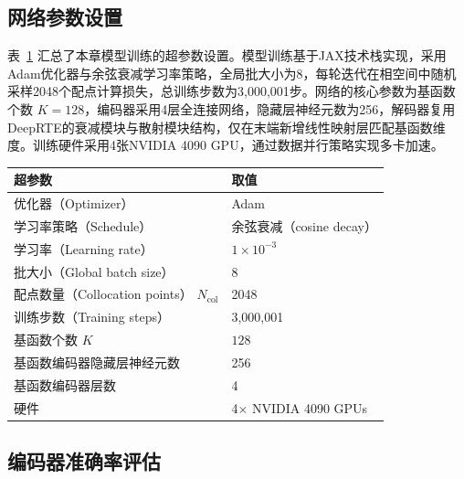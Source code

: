 \subsection{网络参数设置}

表~\ref{tab:training_details_prte} 汇总了本章模型训练的超参数设置。模型训练基于JAX技术栈实现，采用Adam优化器与余弦衰减学习率策略，全局批大小为8，每轮迭代在相空间中随机采样2048个配点计算损失，总训练步数为3,000,001步。网络的核心参数为基函数个数 $K=128$，编码器采用4层全连接网络，隐藏层神经元数为256，解码器复用DeepRTE的衰减模块与散射模块结构，仅在末端新增线性映射层匹配基函数维度。训练硬件采用4张NVIDIA 4090 GPU，通过数据并行策略实现多卡加速。

\begin{table}[!htp]
    \centering
    \begin{tabular}{ll}
        \toprule
        超参数                                     & 取值                         \\ \midrule
        优化器（Optimizer）                          & Adam                       \\
        学习率策略（Schedule）                         & 余弦衰减（cosine decay）         \\
        学习率（Learning rate）                      & $1 \times 10^{-3}$         \\
        批大小（Global batch size）                  & 8                          \\
        配点数量（Collocation points） $N_\text{col}$ & 2048                       \\
        训练步数（Training steps）                    & 3,000,001                  \\
        基函数个数 $K$                               & $128$                      \\
        基函数编码器隐藏层神经元数                           & 256                        \\
        基函数编码器层数                                & 4                          \\
        硬件                                      & 4$\times$ NVIDIA 4090 GPUs \\
        \bottomrule
    \end{tabular}
    \label{tab:training_details_prte}
\end{table}

\subsection{编码器准确率评估}

